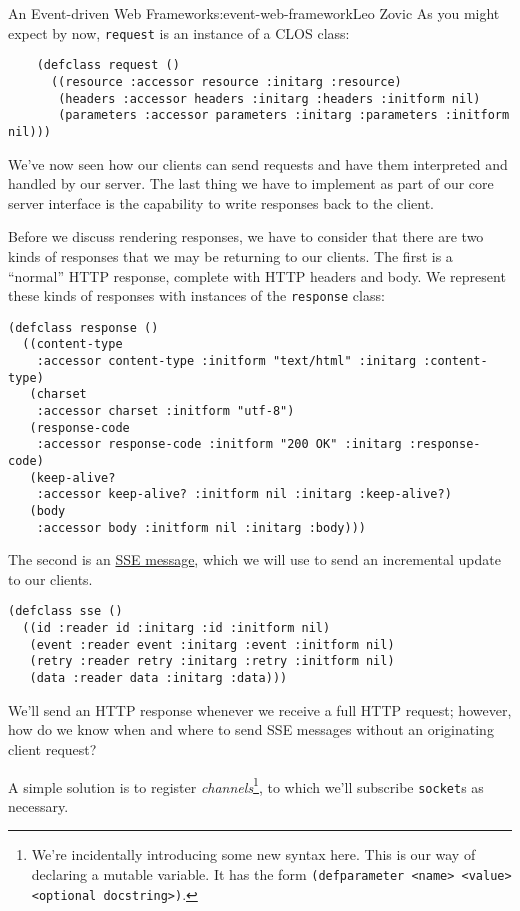 \begin{aosachapter}{An Event-driven Web Framework}{s:event-web-framework}{Leo Zovic}
As you might expect by now, \texttt{request} is an instance of a CLOS
class:

\begin{verbatim}
    (defclass request ()
      ((resource :accessor resource :initarg :resource)
       (headers :accessor headers :initarg :headers :initform nil)
       (parameters :accessor parameters :initarg :parameters :initform nil)))
\end{verbatim}

We've now seen how our clients can send requests and have them
interpreted and handled by our server. The last thing we have to
implement as part of our core server interface is the capability to
write responses back to the client.

\label{rendering-responses}

Before we discuss rendering responses, we have to consider that there
are two kinds of responses that we may be returning to our clients. The
first is a ``normal'' HTTP response, complete with HTTP headers and
body. We represent these kinds of responses with instances of the
\texttt{response} class:

\begin{verbatim}
(defclass response ()
  ((content-type
    :accessor content-type :initform "text/html" :initarg :content-type)
   (charset
    :accessor charset :initform "utf-8")
   (response-code
    :accessor response-code :initform "200 OK" :initarg :response-code)
   (keep-alive?
    :accessor keep-alive? :initform nil :initarg :keep-alive?)
   (body
    :accessor body :initform nil :initarg :body)))
\end{verbatim}

The second is an \href{http://www.w3.org/TR/eventsource/}{SSE message},
which we will use to send an incremental update to our clients.

\begin{verbatim}
(defclass sse ()
  ((id :reader id :initarg :id :initform nil)
   (event :reader event :initarg :event :initform nil)
   (retry :reader retry :initarg :retry :initform nil)
   (data :reader data :initarg :data)))
\end{verbatim}

We'll send an HTTP response whenever we receive a full HTTP request;
however, how do we know when and where to send SSE messages without an
originating client request?

A simple solution is to register \emph{channels}\footnote{We're
  incidentally introducing some new syntax here. This is our way of
  declaring a mutable variable. It has the form
  \texttt{(defparameter \textless{}name\textgreater{} \textless{}value\textgreater{} \textless{}optional docstring\textgreater{})}.},
to which we'll subscribe \texttt{socket}s as necessary.


\end{aosachapter}
